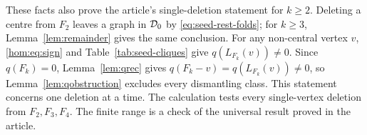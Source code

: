 These facts also prove the article's single-deletion statement for $k\geq2$.
Deleting a centre from $F_2$ leaves a graph in $\mathcal D_0$ by
\eqref{eq:seed-rest-folds}; for $k\geq3$, Lemma~\ref{lem:remainder}
gives the same conclusion. For any non-central vertex $v$,
\eqref{hom:eq:sign} and Table~\ref{tab:seed-cliques} give
$q(L_{F_k}(v))\ne0$. Since $q(F_k)=0$, Lemma~\ref{lem:qrec} gives
$q(F_k-v)=q(L_{F_k}(v))\ne0$, so Lemma~\ref{lem:qobstruction} excludes
every dismantling class. This statement concerns one deletion at a time.
The calculation tests every single-vertex deletion from $F_2,F_3,F_4$.
The finite range is a check of the universal result proved in the article.
